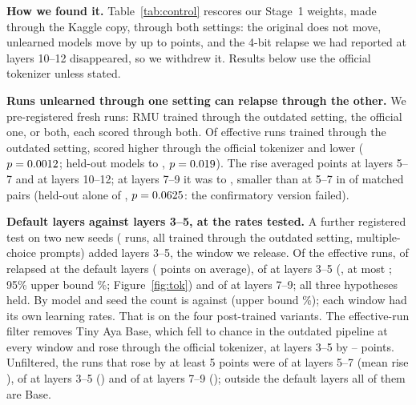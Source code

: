 \documentclass[11pt]{article}
\begin{document}
\textbf{How we found it.}\label{sec:control} Table~\ref{tab:control} rescores our Stage~1 weights, made through the Kaggle copy, through both settings: the original does not move, unlearned models move by up to \ctlMaxRise{} points, and the 4-bit relapse we had reported at layers 10--12 disappeared, so we withdrew it. Results below use the official tokenizer unless stated.



\textbf{Runs unlearned through one setting can relapse through the other.} We pre-registered \shiftRuns{} fresh runs: RMU trained through the outdated setting, the official one, or both, each scored through both. Of \shiftEff{} effective runs trained through the outdated setting, \shiftUp{} scored higher through the official tokenizer and \shiftDown{} lower ($p=0.0012$; held-out models \shiftHeldUp{} to \shiftHeldDown{}, $p=0.019$). The rise averaged \shiftMeanDefault{} points at layers 5--7 and \shiftMeanDeep{} at layers 10--12; at layers 7--9 it was \shiftMidLow{} to \shiftMidHigh{}, smaller than at 5--7 in \shiftPtwoWins{} of \shiftPtwoN{} matched pairs (held-out alone \shiftHeldPtwoWins{} of \shiftHeldPtwoN{}, $p=0.0625$: the confirmatory version failed).

\textbf{Default layers against layers 3--5, at the rates tested.} A further registered test on two new seeds (\stwoRuns{} runs, all trained through the outdated setting, multiple-choice prompts) added layers 3--5, the window we release. Of the effective runs, \stwoDefaultRel{} of \stwoDefaultN{} relapsed at the default layers (\stwoDefaultMean{} points on average), \stwoShallowRel{} of \stwoShallowN{} at layers 3--5 (\stwoShallowMean, at most \stwoShallowMax; 95\% upper bound \stwoShallowUpper\%; Figure~\ref{fig:tok}) and \stwoMidRel{} of \stwoMidN{} at layers 7--9; all three hypotheses held. By model and seed the count is \stwoUnitsDefault{} against \stwoUnitsShallow{} (upper bound \stwoUnitUpper\%); each window had its own learning rates. That is on the four post-trained variants. The effective-run filter removes Tiny Aya Base, which fell to chance in the outdated pipeline at every window and rose through the official tokenizer, at layers 3--5 by \stwoBaseRiseLow--\stwoBaseRiseHigh{} points. Unfiltered, the runs that rose by at least 5 points were \stwoAllDefault{} of \stwoAllN{} at layers 5--7 (mean rise \stwoAllDefaultMean), \stwoAllShallow{} of \stwoAllN{} at layers 3--5 (\stwoAllShallowMean) and \stwoAllMid{} of \stwoAllN{} at layers 7--9 (\stwoAllMidMean); outside the default layers all of them are Base.
\end{document}
